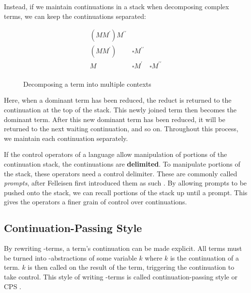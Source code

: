   Instead, if we maintain continuations in a stack when decomposing complex terms, 
  we can keep the continuations separated:
  
  \begin{figure}[H]
    \[
    \begin{array}{lll}
      (MM^\prime) M^{\prime\prime} \\
      (MM^\prime) & \square M^{\prime\prime} \\
      M & \square M^\prime & \square M^{\prime\prime} \\
    \end{array}
    \]
  \caption{Decomposing a term into multiple contexts}
  \end{figure}

  Here, when a dominant term has been reduced, 
  the reduct is returned to the continuation at the top of the stack. 
  This newly joined term then becomes the dominant term. 
  After this new dominant term has been reduced, 
  it will be returned to the next waiting continuation, and so on. 
  Throughout this process, we maintain each continuation separately.

  If the control operators of a language allow manipulation of portions of the continuation stack,
  the continuations are \textbf{delimited}.
  To manipulate portions of the stack, these operators need a control delimiter.
  These are commonly called \emph{prompts}, after Felleisen first introduced them as such \cite{Felleisen88}.
  By allowing prompts to be pushed onto the stack, we can recall portions of the stack up until a prompt.
  This gives the operators a finer grain of control over continuations.

  \subsection{Continuation-Passing Style}
 
  By rewriting \lam-terms, a term's continuation can be made explicit. 
  All terms must be turned into \lam-abstractions of some variable $k$ where $k$ is the continuation of a term. 
  $k$ is then called on the result of the term, triggering the continuation to take control.
  This style of writing \lam-terms is called continuation-passing style or CPS \cite{Sussman98}.
  
  
